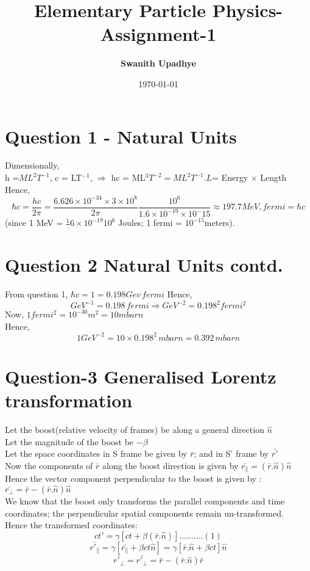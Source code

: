 \documentclass[11pt]{article}
\title{Elementary Particle Physics-Assignment-1}
\author{\textbf{\Large Swanith Upadhye}}
\date{\today}
\begin{document}
	
	\maketitle
	\noindent\hrulefill
	\Large
	
	\section{\color{teal} Question 1 - Natural Units}
	
	Dimensionally,\\
	h =$ML^2T^{-1}$, c = LT$^{-1}$, $\Rightarrow$ hc = ML$^3T^{-2} =ML^2T^{-1}.L $= Energy $\times$ Length\\
	
	Hence,
	\[
		\hbar c = \frac{hc}{2\pi} = \frac{6.626\times 10^{-34} \times 3 \times 10^8}{2\pi}\frac{10^6}{1.6\times10^{-19} \times 10^-15} \approx \boxed{197.7 MeV, fermi = \hbar c}
	\] 
	(since 1 MeV = $\frac1.6 \times 10^{-19}10^6$ Joules; 1 fermi = $10^{-15}$meters).
	
	\section{\color{teal} Question 2 Natural Units contd.}
	 
	 From question 1, $\hbar c = 1 = 0.198 Gev \, fermi  $
	 Hence, 
	\[
		GeV^{-1} = 0.198 \, fermi \Rightarrow GeV^{-2} = 0.198^2 fermi^2
	\]
	Now, $1 fermi^2 = 10^{-30} m^2 = 10 mbarn$\\
	Hence,
	\[
		\boxed{1 GeV^{-2} = 10 \times 0.198^2 \, mbarn = 0.392 \, mbarn}
	\]
	
	\section{\color{teal} Question-3 Generalised Lorentz transformation}
	
	Let the boost(relative velocity of frames) be along a general direction $\hat{n}$\\
	Let the magnitude of the boost be $-\beta$\\
	Let the space coordinates in S frame be given by $\bar{r}$; and in S' frame by $\bar{r'}$\\
	Now the components of $\bar{r}$ along the boost direction is given by $\bar{r_{\parallel}}=(\bar{r}.\hat{n})\hat{n}$\\
	Hence the vector component perpendicular to the boost is given by : $\bar{r_{\perp}} = \bar{r} - (\bar{r}.\hat{n})\hat{n}$\\
	We know that the boost only transforms the parallel components and time coordinates; the perpendicular spatial components remain un-transformed.\\
	Hence the transformed coordinates:
	\[
		\boxed{ct' = \gamma[ct + \beta (\bar{r}.\hat{n})]}..........(1)
	\]
	\[
		\bar{r'_{\parallel}} = \gamma[\bar{r_{\parallel}} + \beta ct\hat{n}] = \gamma[\bar{r}.\hat{n} + \beta ct]\hat{n}
	\]
	\[
		\bar{r'_{\perp}} = \bar{r'_{\perp}} = \bar{r} - (\bar{r}.\hat{n})\bar{r}
	\]
	
\end{document}
